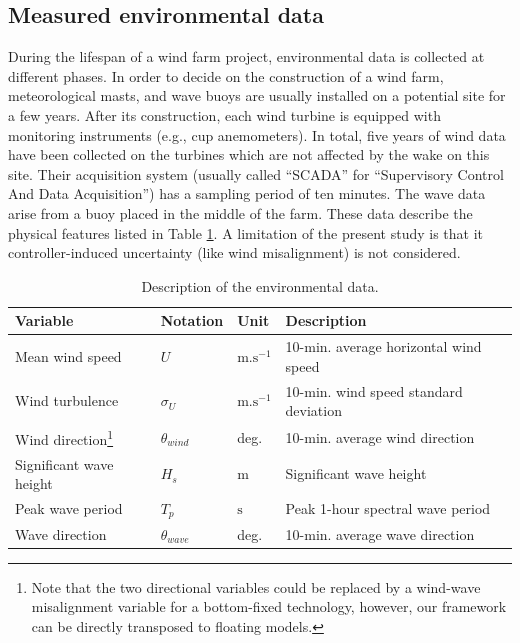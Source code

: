 \subsection{Measured environmental data}
During the lifespan of a wind farm project, environmental data is collected at different phases. 
In order to decide on the construction of a wind farm, meteorological masts, and wave buoys are usually installed on a potential site for a few years. 
After its construction, each wind turbine is equipped with monitoring instruments (e.g., cup anemometers). 
In total, five years of wind data have been collected on the turbines which are not affected by the wake on this site. 
Their acquisition system (usually called ``SCADA'' for ``Supervisory Control And Data Acquisition'') has a sampling period of ten minutes. 
The wave data arise from a buoy placed in the middle of the farm. 
These data describe the physical features listed in Table \ref{tab:envi_variables}. 
A limitation of the present study is that it controller-induced uncertainty (like wind misalignment) is not considered. 

\begin{table}[h!] \caption{Description of the environmental data.}
    \begin{center}
    \begin{tabularx}{\textwidth}{@{\extracolsep\fill}llll@{}}
    \hline
    Variable & Notation & Unit & Description\\
    \hline
    Mean wind speed & $U$ & $\mathrm{m.s^{-1}}$ & 10-min. average horizontal wind speed\\
    Wind turbulence & $\sigma_U $ & $\mathrm{m.s^{-1}}$ & 10-min. wind speed standard deviation\\
    Wind direction\footnote{Note that the two directional variables could be replaced by a wind-wave misalignment variable for a bottom-fixed technology, however, our framework can be directly transposed to floating models.} & $\theta_{wind} $ & deg. &  10-min. average wind direction\\
    Significant wave height & $H_s $ & m & Significant wave height\\
    Peak wave period & $T_p $  & $\mathrm{s}$ & Peak 1-hour spectral wave period \\
    Wave direction & $\theta_{wave} $ & deg. &  10-min. average wave direction\\
    \hline
    \end{tabularx}
    \label{tab:envi_variables}
    \end{center}
\end{table}


